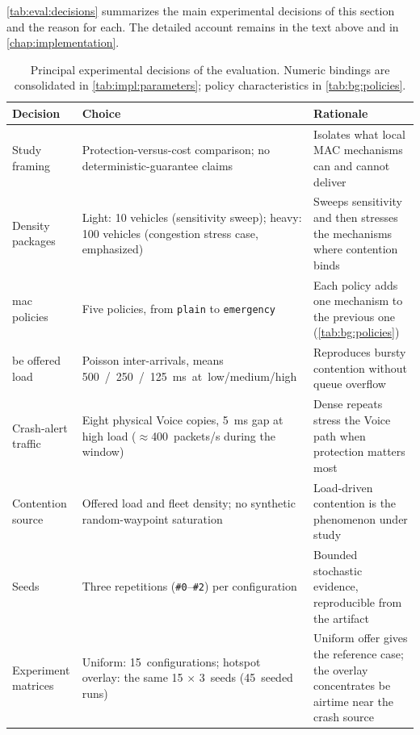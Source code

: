\autoref{tab:eval:decisions} summarizes the main experimental decisions of this section and the reason for each.
The detailed account remains in the text above and in \autoref{chap:implementation}.

\begin{table}[htb]
	\ABNTEXfontereduzida
	\caption{\label{tab:eval:decisions}Principal experimental decisions of the evaluation. Numeric bindings are consolidated in \autoref{tab:impl:parameters}; policy characteristics in \autoref{tab:bg:policies}.}
	\begin{center}
		\begin{tabularx}{\linewidth}{@{}>{\raggedright\arraybackslash}p{3.4cm} >{\raggedright\arraybackslash}X >{\raggedright\arraybackslash}X@{}}
			\toprule
			\textbf{Decision} & \textbf{Choice} & \textbf{Rationale} \\
			\midrule
			Study framing & Protection-versus-cost comparison; no deterministic-guarantee claims & Isolates what local MAC mechanisms can and cannot deliver \\
			\addlinespace
			Density packages & Light: 10 vehicles (sensitivity sweep); heavy: 100 vehicles (congestion stress case, emphasized) & Sweeps sensitivity and then stresses the mechanisms where contention binds \\
			\addlinespace
			\gls{mac} policies & Five policies, from \texttt{plain} to \texttt{emergency} & Each policy adds one mechanism to the previous one (\autoref{tab:bg:policies}) \\
			\addlinespace
			\gls{be} offered load & Poisson inter-arrivals, means \SI{500}/\SI{250}/\SI{125}{\milli\second} at low/medium/high & Reproduces bursty contention without queue overflow \\
			\addlinespace
			Crash-alert traffic & Eight physical Voice copies, \SI{5}{\milli\second} gap at high load ($\approx$400~packets/s during the window) & Dense repeats stress the Voice path when protection matters most \\
			\addlinespace
			Contention source & Offered load and fleet density; no synthetic random-waypoint saturation & Load-driven contention is the phenomenon under study \\
			\addlinespace
			Seeds & Three repetitions (\texttt{\#0}--\texttt{\#2}) per configuration & Bounded stochastic evidence, reproducible from the artifact \\
			\addlinespace
			Experiment matrices & Uniform: 15~configurations; hotspot overlay: the same 15 $\times$ 3~seeds (45~seeded runs) & Uniform offer gives the reference case; the overlay concentrates \gls{be} airtime near the crash source \\
			\bottomrule
		\end{tabularx}
	\end{center}
\end{table}

